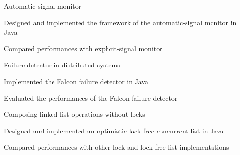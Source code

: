 

\begin{myexp}
    \item Automatic-signal monitor 
        \begin{mybullet}
            \item Designed and implemented the framework of the automatic-signal
                monitor in Java
            \item Compared performances with explicit-signal monitor
        \end{mybullet}
    \item Failure detector in distributed systems       
        \begin{mybullet}
            \item Implemented the Falcon failure detector in Java
            \item Evaluated the performances of the Falcon failure detector
    \end{mybullet}
    \item Composing linked list operations without locks  
        \begin{mybullet}
            \item Designed and implemented an optimistic lock-free concurrent list in Java
            \item Compared performances with other lock and lock-free list implementations
        \end{mybullet}

\end{myexp}
